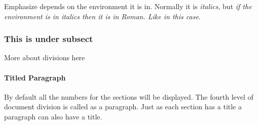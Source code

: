 \documentclass{article}
\begin{document}
  Emphasize depends on the environment it is in.  Normally it is
  \emph{italics},
   but \emph{if the environment is in italics then it is in \emph{Roman}. Like
   in this case}.

 
  \subsubsection{This is  under subsect}

  More about divisions here

 \paragraph{Titled Paragraph}

 By default all the numbers for the sections will be displayed.  The fourth
level of document division is called as a paragraph.  Just as each section
has a title a paragraph can also have a title.
 
\end{document}
